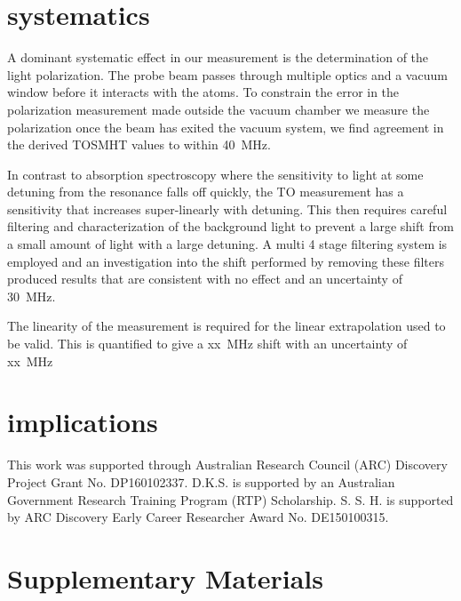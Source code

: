 \documentclass[aps,prl,
,reprint,
superscriptaddress,
onecolumn,
showpacs,preprintnumbers,
 amsmath,amssymb,
]{revtex4-1}
\begin{document}
\section{systematics}
A dominant systematic effect in our measurement is the determination of the light polarization. The probe beam passes through multiple optics and a vacuum window before it interacts with the atoms. To constrain the error in the polarization measurement made outside the vacuum chamber we measure the polarization once the beam has exited the vacuum system, we find agreement in the derived TOSMHT values to within 40~MHz.

In contrast to absorption spectroscopy where the sensitivity to light at some detuning from the resonance falls off quickly, the TO measurement has a sensitivity that increases super-linearly with detuning. This then requires careful filtering and characterization of the background light to prevent a large shift from a small amount of light with a large detuning. A multi 4 stage filtering system is employed and an investigation into the shift performed by removing these filters produced results that are consistent with no effect and an uncertainty of 30~MHz.

The linearity of the measurement is required for the linear extrapolation used to be valid. This is quantified to give a xx~MHz shift with an uncertainty of xx~MHz

\section{implications}












\begin{acknowledgments}
This work was supported through Australian Research
Council (ARC) Discovery Project Grant No. DP160102337. 
D.K.S. is supported by an Australian Government Research Training Program (RTP) Scholarship.
S. S. H. is supported by ARC Discovery Early Career Researcher Award No. DE150100315.
\end{acknowledgments}




\clearpage
\section*{{\large{Supplementary Materials}}}\label{section:SOMs}
\end{document}
